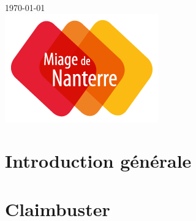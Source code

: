 \documentclass[12pt]{article}
\begin{document}
\begin{titlepage}


{\large \today}\\[2cm] %


\includegraphics[draft=false, scale=0.5]{imgs/miage-nanterre.png}\\[1cm] %
 

\vfill %

\end{titlepage}

\clearpage

\renewcommand*\contentsname{Sommaire}

\clearpage

\tableofcontents

\clearpage

\section{Introduction générale}



\section{Claimbuster}
\end{document}
